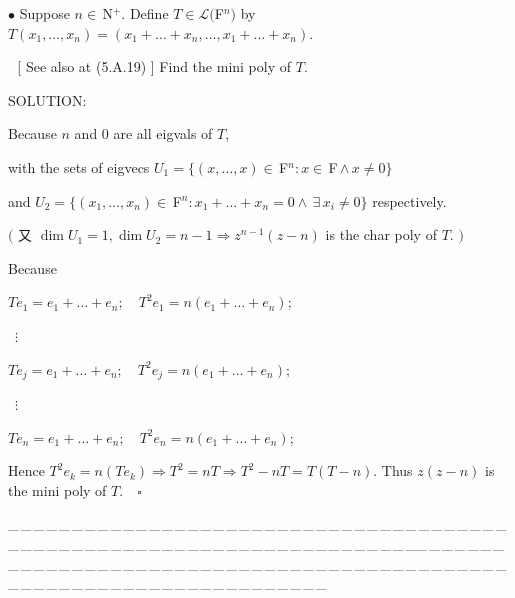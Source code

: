 \documentclass[a4paper, 11pt, UTF8]{article}
\def\Lm{\mathcal{L}}
\def\Fbf{$\,{\timesbf F}\,$}
\def\Fbfc{$\,{\timesbf F}$}
\def\Nbp{$\,{\timesbf N}$^+}
\begin{document}
\begin{large}
{\small $\bullet$} {\timessl\Large 
Suppose $n\in\Nbp$. Define $T\in\Lm(${\timesbf F}$^{n})$ by $T(x_1,\dots,x_n)=(x_1+\dots+x_n,\dots,x_1+\dots+x_n).$}\par\,\,
[ {\timessl See also at }(5.A.19) ] {\timessl\Large Find the mini poly of $T$.}\par
{\timesbf S\footnotesize{OLUTION:}}\par\quad
Because $n$ and $0$ are all eigvals of $T$,\par\quad
with the sets of eigvecs $U_1=\{(x,\dots,x)\in\Fbfc^n:x\in\Fbf\wedge\,x\neq 0\}$\par\qquad\qquad\qquad\qquad\quad
and $U_2=\{(x_1,\dots,x_n)\in\Fbfc^n:x_1+\dots+x_n=0\wedge \,\exists\,x_i\neq 0\}$ respectively.\par\quad
$($ 又 $\dim U_1=1,\dim U_2=n-1\Rightarrow z^{n-1}(z-n)$ is the char poly of $T$. $)$\par\quad
Because\par\quad
$T e_1=e_1+\dots+e_n;\quad T^2 e_1=n (e_1+\dots+e_n);$\par\quad
$\,\,\,\vdots$\par\quad
$T e_j=e_1+\dots+e_n;\quad T^2 e_j=n (e_1+\dots+e_n);$\par\quad
$\,\,\,\vdots$\par\quad
$T e_n=e_1+\dots+e_n;\quad T^2 e_n=n (e_1+\dots+e_n);$\par\quad
Hence $T^2 e_k=n(T e_k)\Rightarrow T^2=n T\Rightarrow T^2-n T=T(T-n).$ Thus $z(z-n)$ is the mini poly of $T.\quad\square$\par
{\tiny \_\,\_\,\_\,\_\,\_\,\_\,\_\,\_\,\_\,\_\,\_\,\_\,\_\,\_\,\_\,\_\,\_\,\_\,\_\,\_\,\_\,\_\,\_\,\_\,\_\,\_\,\_\,\_\,\_\,\_\,\_\,\_\,\_\,\_\,\_\,\_\,\_\,\_\,\_\,\_\,\_\,\_\,\_\,\_\,\_\,\_\,\_\,\_\,\_\,\_\,\_\,\_\,\_\,\_\,\_\,\_\,\_\,\_\,\_\,\_\,\_\,\_\,\_\,\_\,\_\,\_\,\_\,\_\,\_\,\_\,\_\_\,\_\,\_\,\_\,\_\,\_\,\_\,\_\,\_\,\_\,\_\,\_\,\_\,\_\,\_\,\_\,\_\,\_\,\_\,\_\,\_\,\_\,\_\,\_\,\_\,\_\,\_\,\_\,\_\,\_\,\_\,\_\,\_\,\_\,\_\,\_\,\_\,\_\,\_\,\_\,\_\,\_\,\_\,\_\,\_\,\_\,\_\,\_\,\_\,\_\,\_\,\_\,\_\,\_\,\_\,\_\,\_\,\_\,\_\,\_\,\_\,\_\,\_\,\_\,\_\,\_\,\_\,\_\,\_\,\_\,\_}\par


\end{large}
\end{document}
